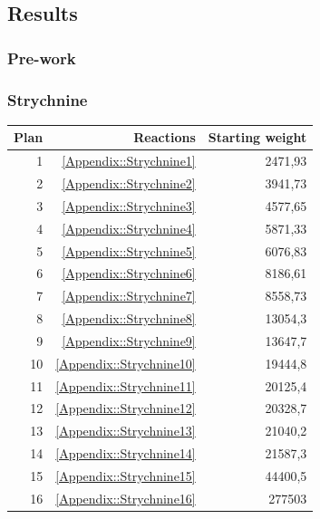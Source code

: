 \documentclass[a4paper,10pt,titlepage]{paper}
\begin{document}
\subsection{Results}
\subsubsection{Pre-work}
\subsubsection{Strychnine}
\begin{table}[H]
\centering
\begin{tabular}{|r|r|r|}
\hline
Plan & Reactions & Starting weight \\ \hline
1 & \ref{Appendix::Strychnine1} & 2471,93 \\\hline
2 & \ref{Appendix::Strychnine2} & 3941,73 \\\hline
3 & \ref{Appendix::Strychnine3} & 4577,65 \\\hline
4 & \ref{Appendix::Strychnine4} & 5871,33 \\\hline
5 & \ref{Appendix::Strychnine5} & 6076,83 \\\hline
6 & \ref{Appendix::Strychnine6} & 8186,61 \\\hline
7 & \ref{Appendix::Strychnine7} & 8558,73 \\\hline
8 & \ref{Appendix::Strychnine8} & 13054,3 \\\hline
9 & \ref{Appendix::Strychnine9} & 13647,7 \\\hline
10 & \ref{Appendix::Strychnine10} & 19444,8 \\\hline
11 & \ref{Appendix::Strychnine11} & 20125,4 \\\hline
12 & \ref{Appendix::Strychnine12} & 20328,7 \\\hline
13 & \ref{Appendix::Strychnine13} & 21040,2 \\\hline
14 & \ref{Appendix::Strychnine14} & 21587,3 \\\hline
15 & \ref{Appendix::Strychnine15} & 44400,5 \\\hline
16 & \ref{Appendix::Strychnine16} & 277503 \\\hline

\end{tabular}
\end{table}
\end{document}
